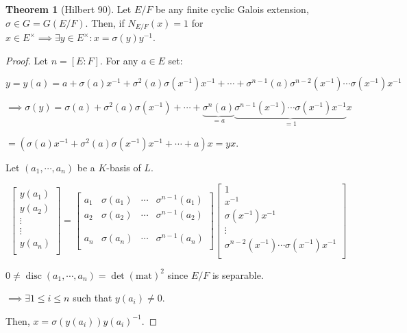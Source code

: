 \documentclass{article}
\theoremstyle{definition}
\newtheorem{theorem}{Theorem}
\numberwithin{theorem}{subsection}
\begin{document}
    \begin{theorem}
        [Hilbert 90]

        Let \(E / F\) be any finite cyclic Galois extension, \(\sigma \in G = G(E / F)\). Then, if \(N_{E / F}(x) = 1\) for \(x \in E^\times \implies \exists y\in E^\times : x = \sigma(y) y ^{-1}\). 
    \end{theorem}

    \begin{proof}
        Let \(n=[E:F]\). For any \(a\in E\) set:

        \[
            y = y(a) = a + \sigma (a) x ^{-1}  + \sigma^2 (a) \sigma (x ^{-1}) x ^{-1} + \cdots + \sigma^{n-1}(a) \sigma^{n-2}(x ^{-1}) \cdots \sigma(x ^{-1}) x ^{-1} 
        \]

        \(\implies \sigma(y) = \sigma(a) + \sigma^2(a) \sigma (x ^{-1}) + \cdots + \underbrace{\sigma^n(a)}_{=a}  \underbrace{\sigma^{n-1}(x ^{-1}) \cdots \sigma(x ^{-1}) x ^{-1}}_{= 1} x\) 

        \(= (\sigma (a) x ^{-1} + \sigma^2(a) \sigma(x ^{-1}) x ^{-1} + \cdots + a) x = yx\).
        
        Let \((a_1, \cdots , a_n)\) be a \(K\)-basis of \(L\).

        \[
            \begin{bmatrix}
                y(a_1) \\
                y(a_2) \\
                \vdots \\
                \vdots \\
                y(a_n) \\
            \end{bmatrix} = \begin{bmatrix}
                a_1 & \sigma(a_1) & \cdots & \sigma^{n-1}(a_1) \\
                a_2 & \sigma(a_2) & \cdots  & \sigma^{n-1}(a_2) \\
                 &  &  &  \\
                 &  &  &  \\
                a_n & \sigma(a_n) & \cdots & \sigma^{n-1}(a_n) \\
            \end{bmatrix} \begin{bmatrix}
                1 \\
                x ^{-1}  \\
                \sigma (x ^{-1}) x ^{-1} \\
                \vdots \\
                \sigma^{n-2}(x ^{-1}) \cdots \sigma(x ^{-1}) x ^{-1} \\
            \end{bmatrix} 
        \]

        \(0 \neq \operatorname{disc} (a_1, \cdots , a_n) = \det(\text{mat})^2\) since \(E / F\) is separable.
        
        \(\implies \exists 1 \leq i \leq n\) such that \(y(a_i) \neq 0\).

        Then, \(x = \sigma(y(a_i)) y(a_i) ^{-1}\).
    \end{proof}
\end{document}
